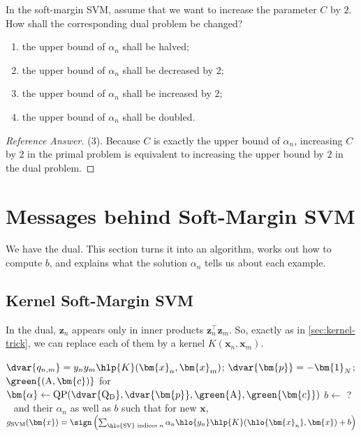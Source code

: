 \begin{exercise}
    In the soft-margin SVM, assume that we want to increase the parameter
    \(C\) by \(2\). How shall the corresponding dual problem be changed?
    \begin{enumerate}[(1)]
        \item the upper bound of \(\alpha_n\) shall be halved;
        \item the upper bound of \(\alpha_n\) shall be decreased by \(2\);
        \item the upper bound of \(\alpha_n\) shall be increased by \(2\);
        \item the upper bound of \(\alpha_n\) shall be doubled.
    \end{enumerate}
\end{exercise}

\begin{proof}[Reference Answer]
    (3). Because \(C\) is exactly the upper bound of \(\alpha_n\), increasing
    \(C\) by \(2\) in the primal problem is equivalent to increasing the
    upper bound by \(2\) in the dual problem.
\end{proof}

\section{Messages behind Soft-Margin SVM}\label{sec:soft-messages}


We have the dual. This section turns it into an algorithm, works out how to
compute \(b\), and explains what the solution \(\alpha_n\) tells us about
each example.

\subsection{Kernel Soft-Margin SVM}

In the dual, \(\bm{z}_n\) appears only in inner products
\(\bm{z}_n^\top \bm{z}_m\). So, exactly as in \autoref{sec:kernel-trick}, we
can replace each of them by a kernel \(K(\bm{x}_n, \bm{x}_m)\).

\begin{algorithm}[H]
    \caption{ Soft-Margin M}\label{alg:kernel-soft-svm}
    \(\dvar{q_{n,m}} = y_n y_m \hlp{K}(\bm{x}_n, \bm{x}_m)\);
        \(\dvar{\bm{p}} = -\bm{1}_N\); \(\green{(\mathrm{A}, \bm{c})}\) for
        \;
    \(\bm{\alpha} \gets \mathrm{QP}(\dvar{\mathrm{Q}_{\mathrm{D}}},
        \dvar{\bm{p}}, \green{\mathrm{A}}, \green{\bm{c}})\)\;
    \(b \gets\) ?\;
    \Return\  and their \(\alpha_n\) as well as \(b\) such that for
        new \(\bm{x}\),
        \(g_{\mathrm{SVM}}(\bm{x}) = \sign \left( \sum_{\hlo{\text{SV}}
        \text{ indices } n} \alpha_n \hlo{y_n} \hlp{K}(\hlo{\bm{x}_n},
        \bm{x}) + b \right)\)\;
\end{algorithm}


